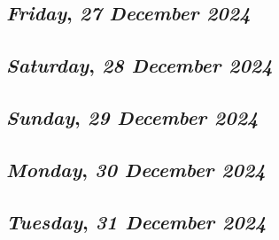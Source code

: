\def\day{\textit{27 December 2024}}
\def\weekday{\textit{Friday}}
\subsection*{\weekday, \day}

\def\day{\textit{28 December 2024}}
\def\weekday{\textit{Saturday}}
\subsection*{\weekday, \day}

\def\day{\textit{29 December 2024}}
\def\weekday{\textit{Sunday}}
\subsection*{\weekday, \day}

\def\day{\textit{30 December 2024}}
\def\weekday{\textit{Monday}}
\subsection*{\weekday, \day}

\def\day{\textit{31 December 2024}}
\def\weekday{\textit{Tuesday}}
\subsection*{\weekday, \day}
